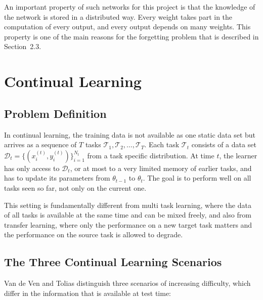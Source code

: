 An important property of such networks for this project is that the
knowledge of the network is stored in a distributed way. Every weight
takes part in the computation of every output, and every output depends on
many weights. This property is one of the main reasons for the forgetting
problem that is described in Section~2.3.

\section{Continual Learning}
\label{sec:cl}

\subsection{Problem Definition}

In continual learning, the training data is not available as one static
data set but arrives as a sequence of $T$ tasks
$\mathcal{T}_1, \mathcal{T}_2, \dots, \mathcal{T}_T$. Each task
$\mathcal{T}_t$ consists of a data set
$\mathcal{D}_t = \{(x_i^{(t)}, y_i^{(t)})\}_{i=1}^{N_t}$
from a task specific distribution. At time $t$, the learner has only access
to $\mathcal{D}_t$, or at most to a very limited memory of earlier tasks,
and has to update its parameters from $\theta_{t-1}$ to $\theta_t$. The
goal is to perform well on all tasks seen so far, not only on the current
one.

This setting is fundamentally different from multi task learning, where the
data of all tasks is available at the same time and can be mixed freely,
and also from transfer learning, where only the performance on a new target
task matters and the performance on the source task is allowed to degrade.

\subsection{The Three Continual Learning Scenarios}
\label{sec:scenarios}

Van de Ven and Tolias \cite{vandeven2019} distinguish three scenarios of
increasing difficulty, which differ in the information that is available at
test time:

